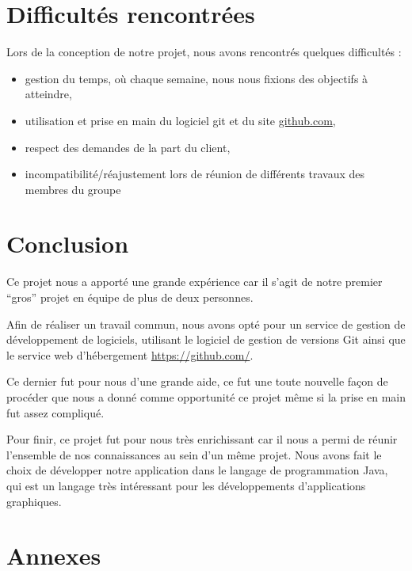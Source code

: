 \newpage
\section{Difficultés rencontrées}
Lors de la conception de notre projet, nous avons rencontrés quelques difficultés :
\begin{itemize}
 \item gestion du temps, où chaque semaine, nous nous fixions des objectifs à atteindre,
 \item utilisation et prise en main du logiciel git et du site 
	    \href{https://github.com/yuki1996/Sudoku}{github.com}, 
 \item respect des demandes de la part du client, 
 \item incompatibilité/réajustement lors de réunion de différents travaux des membres du groupe
\end{itemize}


\section{Conclusion}
Ce projet nous a apporté une grande expérience car il s'agit 
de notre premier ``gros'' projet en équipe de plus de deux personnes.

Afin de réaliser un travail commun, nous avons opté pour un service 
de gestion de développement de logiciels, utilisant le logiciel 
de gestion de versions Git ainsi que le service web d'hébergement \url{https://github.com/}.

Ce dernier fut pour nous d'une grande aide, ce fut une toute nouvelle façon de 
procéder que nous a donné comme opportunité ce projet même si la prise en main 
fut assez compliqué.

Pour finir, ce projet fut pour nous très enrichissant car il nous a permi de réunir
l'ensemble de nos connaissances au sein d'un même projet. Nous avons fait le choix 
de développer notre application dans le langage de programmation Java, qui est un langage
très intéressant pour les développements d'applications graphiques.

\section{Annexes}

